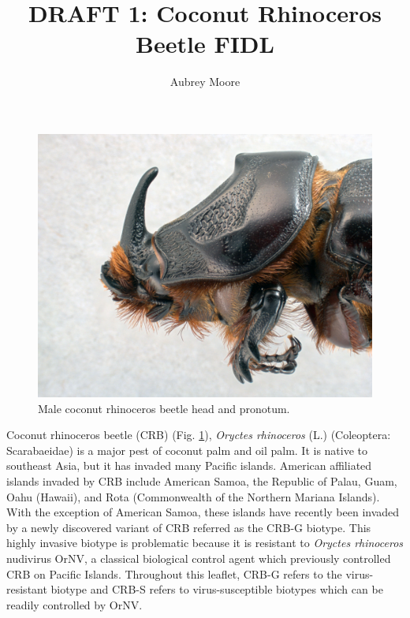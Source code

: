 \documentclass[twocolumn,letterpaper]{scrartcl}
\begin{document}
\title{DRAFT 1: Coconut Rhinoceros Beetle FIDL}
\author{Aubrey Moore}
\maketitle


\newpage

\begin{figure}[h]
	\centering
	\includegraphics[width=\linewidth]{images/rhino_beetle_head}
	\caption{Male coconut rhinoceros beetle head and pronotum.}
	\label{fig:rhinobeetlehead}
\end{figure}

Coconut rhinoceros beetle (CRB) (Fig. \ref{fig:rhinobeetlehead}), \textit{Oryctes rhinoceros} (L.) (Coleoptera: Scarabaeidae) is a major pest of coconut palm and oil palm. It is native to southeast Asia, but it has invaded many Pacific islands. American affiliated islands invaded by CRB include American Samoa, the Republic of Palau, Guam, Oahu (Hawaii), and Rota (Commonwealth of the Northern Mariana Islands). With the exception of American Samoa, these islands have recently been invaded by a newly discovered variant of CRB referred as the CRB-G biotype. This highly invasive biotype is problematic because it is resistant to \textit{Oryctes rhinoceros} nudivirus OrNV, a classical biological control agent which previously controlled CRB on Pacific Islands. Throughout this leaflet, CRB-G refers to the virus-resistant biotype and CRB-S refers to virus-susceptible biotypes which can be readily controlled by OrNV.
\end{document}
